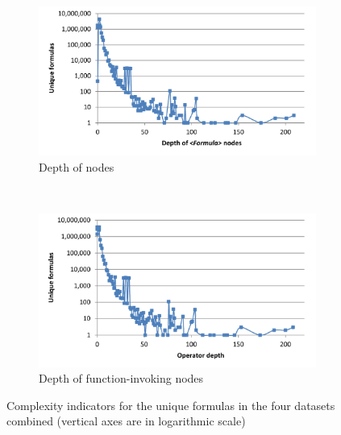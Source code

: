 \documentclass[times]{smrauth}
\begin{document}
\begin{figure}
 	\begin{subfigure}[b]{0.49\textwidth}
 		\centering
 		\includegraphics[width=1\textwidth]{img/depths2}
 		\caption{Depth of  nodes}
 		\label{fig:depthFormula}
 	\end{subfigure}
 	~
 	\begin{subfigure}[b]{0.49\textwidth}
 		\centering
 		\includegraphics[width=1\textwidth]{img/depths3}
 		\caption{Depth of function-invoking nodes}
 		\label{fig:depthOperator}
 	\end{subfigure}
 	\caption{Complexity indicators for the unique formulas in the four datasets combined (vertical axes are in logarithmic scale)}\label{Figure:depths}
 \end{figure}
 
\end{document}
